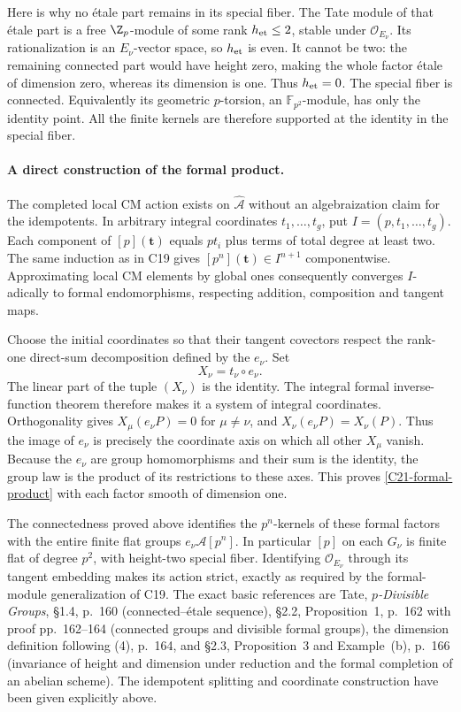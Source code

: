 \documentclass[11pt]{article}
\theoremstyle{definition}\newtheorem{definition}[theorem]{Definition}\newtheorem{remark}[theorem]{Remark}
\begin{document}
Here is why no \'etale part remains in its special fiber.
The Tate module of that \'etale part is a free $\Z_p$-module
of some rank $h_{\rm et}\leq2$, stable under
$\mathcal O_{E_\nu}$.  Its rationalization is an
$E_\nu$-vector space, so $h_{\rm et}$ is even.
It cannot be two: the remaining connected part would have
height zero, making the whole factor \'etale of dimension
zero, whereas its dimension is one.  Thus $h_{\rm et}=0$.
The special fiber is connected.  Equivalently its geometric
$p$-torsion, an $\mathbb F_{p^2}$-module, has only the
identity point.  All the finite kernels are therefore supported
at the identity in the special fiber.

\paragraph{A direct construction of the formal product.}
The completed local CM action exists on
$\widehat{\mathcal A}$ without an algebraization claim for
the idempotents.  In arbitrary integral coordinates
$t_1,\ldots,t_g$, put $I=(p,t_1,\ldots,t_g)$.
Each component of $[p](\mathbf t)$ equals $pt_i$ plus
terms of total degree at least two.  The same induction as
in C19 gives $[p^n](\mathbf t)\in I^{n+1}$ componentwise.
Approximating local CM elements by global ones consequently
converges $I$-adically to formal endomorphisms, respecting
addition, composition and tangent maps.

Choose the initial coordinates so that their tangent
covectors respect the rank-one direct-sum decomposition
defined by the $e_\nu$.  Set
\[
 X_\nu=t_\nu\circ e_\nu.
\]
The linear part of the tuple $(X_\nu)$ is the identity.
The integral formal inverse-function theorem therefore makes
it a system of integral coordinates.  Orthogonality gives
$X_\mu(e_\nu P)=0$ for $\mu\ne\nu$, and
$X_\nu(e_\nu P)=X_\nu(P)$.
Thus the image of $e_\nu$ is precisely the coordinate axis
on which all other $X_\mu$ vanish.  Because the $e_\nu$ are
group homomorphisms and their sum is the identity, the group
law is the product of its restrictions to these axes.
This proves \eqref{C21-formal-product} with each factor
smooth of dimension one.

The connectedness proved above identifies the $p^n$-kernels
of these formal factors with the entire finite flat groups
$e_\nu\mathcal A[p^n]$.  In particular $[p]$ on each
$G_\nu$ is finite flat of degree $p^2$, with height-two
special fiber.  Identifying $\mathcal O_{E_\nu}$ through
its tangent embedding makes its action strict, exactly as
required by the formal-module generalization of C19.
The exact basic references are Tate, \emph{$p$-Divisible
Groups}, \S1.4, p.~160 (connected--\'etale sequence),
\S2.2, Proposition~1, p.~162 with proof pp.~162--164
(connected groups and divisible formal groups), the
dimension definition following (4), p.~164, and
\S2.3, Proposition~3 and Example~(b), p.~166
(invariance of height and dimension under reduction and
the formal completion of an abelian scheme).
The idempotent splitting and coordinate construction have
been given explicitly above.
\end{document}

